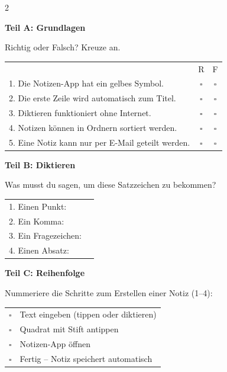 \documentclass[a4paper,landscape,8pt]{extarticle}
\begin{document}
\begin{multicols}{2}

\textbf{\large Teil A: Grundlagen}

Richtig oder Falsch? Kreuze an.

\vspace{2mm}

\renewcommand{\arraystretch}{1.6}
\begin{tabular}{@{}p{8cm}cc@{}}
& R & F \\
1. Die Notizen-App hat ein gelbes Symbol. & $\square$ & $\square$ \\
2. Die erste Zeile wird automatisch zum Titel. & $\square$ & $\square$ \\
3. Diktieren funktioniert ohne Internet. & $\square$ & $\square$ \\
4. Notizen können in Ordnern sortiert werden. & $\square$ & $\square$ \\
5. Eine Notiz kann nur per E-Mail geteilt werden. & $\square$ & $\square$ \\
\end{tabular}
\renewcommand{\arraystretch}{1}

\vspace{6mm}

\textbf{\large Teil B: Diktieren}

Was musst du sagen, um diese Satzzeichen zu bekommen?

\vspace{2mm}

\renewcommand{\arraystretch}{1.8}
\begin{tabular}{@{}p{4cm}p{5cm}@{}}
1. Einen Punkt: & \dotfill \\
2. Ein Komma: & \dotfill \\
3. Ein Fragezeichen: & \dotfill \\
4. Einen Absatz: & \dotfill \\
\end{tabular}
\renewcommand{\arraystretch}{1}

\vspace{6mm}

\textbf{\large Teil C: Reihenfolge}

Nummeriere die Schritte zum Erstellen einer Notiz (1--4):

\vspace{2mm}

\renewcommand{\arraystretch}{1.8}
\begin{tabular}{@{}cp{7cm}@{}}
$\square$ & Text eingeben (tippen oder diktieren) \\
$\square$ & Quadrat mit Stift antippen \\
$\square$ & Notizen-App öffnen \\
$\square$ & Fertig -- Notiz speichert automatisch \\
\end{tabular}
\renewcommand{\arraystretch}{1}


\end{multicols}
\end{document}
